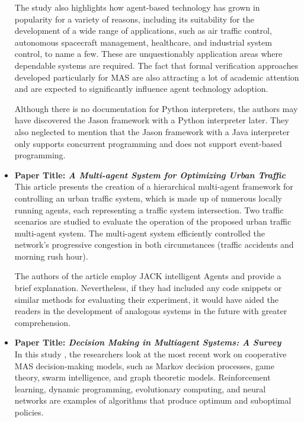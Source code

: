 \begin{itemize}[label={}]
\vspace{.5cm}

The study also highlights how agent-based technology has grown in popularity for a variety of reasons, including its suitability for the development of a wide range of applications, such as air traffic control, autonomous spacecraft management, healthcare, and industrial system control, to name a few. These are unquestionably application areas where dependable systems are required. The fact that formal verification approaches developed particularly for \ac{MAS} are also attracting a lot of academic attention and are expected to significantly influence agent technology adoption.

\vspace{.5cm}
Although there is no documentation for Python interpreters, the authors may have discovered the Jason framework with a Python interpreter later. They also neglected to mention that the Jason framework with a Java interpreter only supports concurrent programming and does not support event-based programming.
\vspace{.5cm}

\item \textbf{Paper Title: \textit{A Multi-agent System for Optimizing Urban Traffic}}\\

This article \cite{traffmulti} presents the creation of a hierarchical multi-agent framework for controlling an urban traffic system, which is made up of numerous locally running agents, each representing a traffic system intersection. Two traffic scenarios are studied to evaluate the operation of the proposed urban traffic multi-agent system. The multi-agent system efficiently controlled the network's progressive congestion in both circumstances (traffic accidents and morning rush hour).

\vspace{.5cm}
The authors of the article employ JACK intelligent Agents and provide a brief explanation. Nevertheless, if they had included any code snippets or similar methods for evaluating their experiment, it would have aided the readers in the development of analogous systems in the future with greater comprehension.
\vspace{.5cm}

\item \textbf{Paper Title: \textit{Decision Making in Multiagent Systems: A Survey}} \\

In this study \cite{decision}, the researchers look at the most recent work on cooperative MAS decision-making models, such as Markov decision processes, game theory, swarm intelligence, and graph theoretic models. Reinforcement learning, dynamic programming, evolutionary computing, and neural networks are examples of algorithms that produce optimum and suboptimal policies.


\end{itemize}
